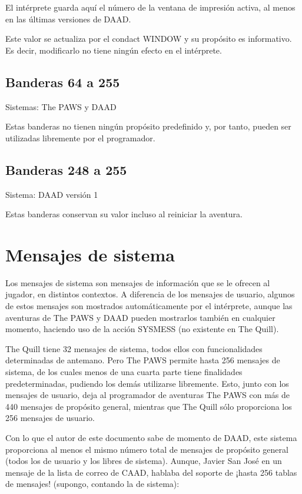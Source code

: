 \documentclass[11pt, a5paper]{article}
\newcommand{\quill}{\textsf{The Quill}\xspace}
\newcommand{\paw}{\textsf{The PAWS}\xspace}
\newcommand{\daad}{\textsf{DAAD}\xspace}
\newcommand{\sistema}[1]{\noindent Sistema: #1 \nopagebreak}
\newcommand{\sistemas}[1]{\noindent Sistemas: #1 \nopagebreak}
\begin{document}
El intérprete guarda aquí el número de la ventana de impresión activa, al menos en las últimas versiones de \daad. \cite[pág. 62]{DAAD}

Este valor se actualiza por el condact WINDOW y su propósito es informativo. Es decir, modificarlo no tiene ningún efecto en el intérprete.

\subsection{Banderas 64 a 255}

\sistemas{\paw y \daad}

Estas banderas no tienen ningún propósito predefinido y, por tanto, pueden ser utilizadas libremente por el programador.

\subsection{Banderas 248 a 255}

\sistema{\daad versión 1}

Estas banderas conservan su valor incluso al reiniciar la aventura.


\section{Mensajes de sistema}

Los mensajes de sistema son mensajes de información que se le ofrecen al jugador, en distintos contextos. A diferencia de los mensajes de usuario, algunos de estos mensajes son mostrados automáticamente por el intérprete, aunque las aventuras de \paw y \daad pueden mostrarlos también en cualquier momento, haciendo uso de la acción SYSMESS (no existente en \quill).

\quill tiene 32 mensajes de sistema, todos ellos con funcionalidades determinadas de antemano. Pero \paw permite hasta 256 mensajes de sistema, de los cuales menos de una cuarta parte tiene finalidades predeterminadas, pudiendo los demás utilizarse libremente. Esto, junto con los mensajes de usuario, deja al programador de aventuras \paw con más de 440 mensajes de propósito general, mientras que \quill sólo proporciona los 256 mensajes de usuario.

Con lo que el autor de este documento sabe de momento de \daad, este sistema proporciona al menos el mismo número total de mensajes de propósito general (todos los de usuario y los libres de sistema). Aunque, Javier San José en un mensaje \cite{JSJ} de la lista de correo de CAAD, hablaba del soporte de ¡hasta 256 tablas de mensajes! (supongo, contando la de sistema):
\end{document}
